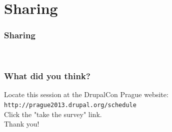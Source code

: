\documentclass[presentation]{beamer}
\newcommand{\xitem}[1]{\item{\shadowtext{#1}}}
\begin{document}
\section{Sharing}
\begin{frame}
\frametitle{Sharing}
\begin{center}
\LARGE
{}\\
\vspace{2cm}
\end{center}
\end{frame}
\begin{frame}
\frametitle{What did you think?}
\large
Locate this session at the DrupalCon Prague website:\\
{\color{inuits}\texttt{http://prague2013.drupal.org/schedule}}\\
\vspace{0.5cm}
Click the "take the survey" link.\\
\vspace{2cm}
{\Huge{Thank you!}}
\end{frame}
\end{document}

